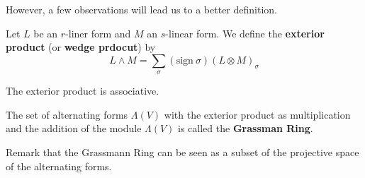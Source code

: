 However, a few observations will lead us to a better definition.

\begin{definition}
	Let $L$ be an $r$-liner form and $M$ an $s$-linear form. We define the \textbf{exterior product} (or \textbf{wedge prdocut}) by
	\[
		L \wedge M = \sum_\sigma (\text{sign}~\sigma) (L \otimes M)_\sigma
	\]
\end{definition}

\begin{theorem}
	The exterior product is associative.
\end{theorem}

\begin{definition}
	The set of alternating forms $\Lambda(V)$ with the exterior product as multiplication and the addition of the module $\Lambda(V)$ is called the \textbf{Grassman Ring}.
\end{definition}

Remark that the Grassmann Ring can be seen as a subset of the projective space of the alternating forms.